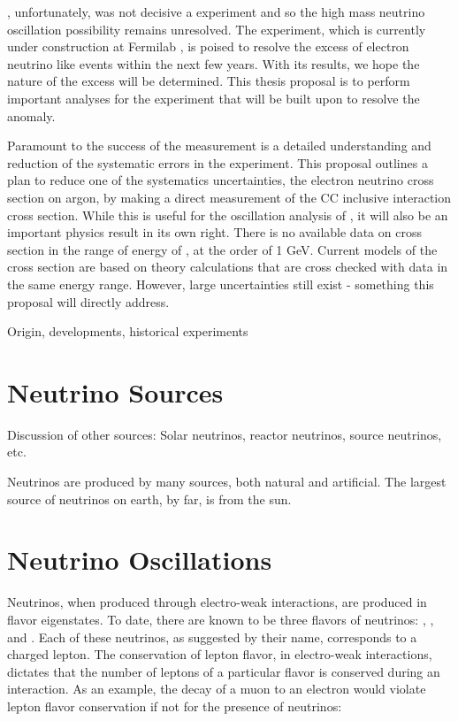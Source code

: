 \MB, unfortunately, was not decisive a experiment and so the high mass neutrino oscillation possibility remains unresolved.  The \uboone experiment, which is currently under construction at Fermilab \cite{uboone}, is poised to resolve the \MB excess of electron neutrino like events within the next few years.  With its results, we hope the nature of the excess will be determined.  This thesis proposal is to perform important analyses for the \uboone experiment that will be built upon to resolve the \MB anomaly.

Paramount to the success of the \uboone measurement is a detailed understanding and reduction of the systematic errors in the experiment.  This proposal outlines a plan to reduce one of the systematics uncertainties, the electron neutrino cross section on argon, by making a direct measurement of the CC inclusive interaction cross section.  While this is useful for the oscillation analysis of \uboone, it will also be an important physics result in its own right.  There is no available data on \nue cross section in the range of energy of \uboone, at the order of 1 GeV.  Current models of the cross section are based on theory calculations that are cross checked with \numu data in the same energy range.  However, large uncertainties still exist - something this proposal will directly address.



Origin, developments, historical experiments


\section{Neutrino Sources}
Discussion of other sources: Solar neutrinos, reactor neutrinos, source neutrinos, etc.

Neutrinos are produced by many sources, both natural and artificial.  The largest source of neutrinos on earth, by far, is from the sun.

\section{Neutrino Oscillations}

Neutrinos, when produced through electro-weak interactions, are produced in flavor eigenstates.  To date, there are known to be three flavors of neutrinos: \nue, \numu, and \nutau.  Each of these neutrinos, as suggested by their name, corresponds to a charged lepton.  The conservation of lepton flavor, in electro-weak interactions, dictates that the number of leptons of a particular flavor is conserved during an interaction.  As an example, the decay of a muon to an electron would violate lepton flavor conservation if not for the presence of neutrinos:

